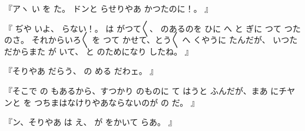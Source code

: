 『アヽ
い
を
た。
ドンと
らせりやあ
かつたのに！。
』

『
ぢや
いよ、
らない！。
は
がつて〳〵{}、
のあるのを
ひに
へ
と
ぎに
つて
つたのさ。
それからいろ〳〵
を
つて
かせて、とう〳〵
へ
くやうに
たんだが、
いつた
だからまた
が
いて、
と
のためになり
したね。
』

『そりやあ
だらう、
の
める
だわェ。
』

『そこで
の
もあるから、すつかり
のものに
て
はうと
ふんだが、まあ
にチヤンと
を
つちまはなけりやあならないのが
の
だ。
』

『ン、そりやあ
は
え、
が
をかいて
らあ。
』

